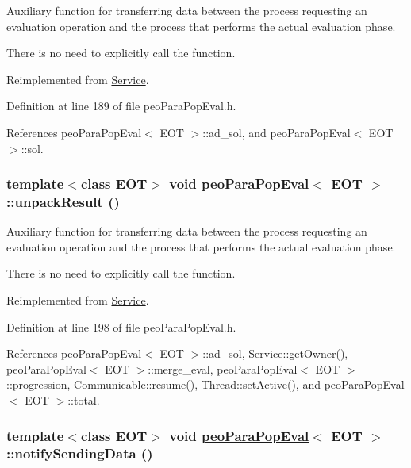 Auxiliary function for transferring data between the process requesting an evaluation operation and the process that performs the actual evaluation phase. 

There is no need to explicitly call the function. 

Reimplemented from \hyperlink{classService_e5e4f90b2315e15c2a2913bd370f4cf5}{Service}.

Definition at line 189 of file peo\-Para\-Pop\-Eval.h.

References peo\-Para\-Pop\-Eval$<$ EOT $>$::ad\_\-sol, and peo\-Para\-Pop\-Eval$<$ EOT $>$::sol.\hypertarget{classpeoParaPopEval_fd7f0afe9cba30be39269d16097e190e}{
\subsubsection[unpackResult]{\setlength{\rightskip}{0pt plus 5cm}template$<$class EOT$>$ void \hyperlink{classpeoParaPopEval}{peo\-Para\-Pop\-Eval}$<$ EOT $>$::unpack\-Result ()}}
\label{classpeoParaPopEval_fd7f0afe9cba30be39269d16097e190e}


Auxiliary function for transferring data between the process requesting an evaluation operation and the process that performs the actual evaluation phase. 

There is no need to explicitly call the function. 

Reimplemented from \hyperlink{classService_45c06344edbfa482b91f68e2035a6099}{Service}.

Definition at line 198 of file peo\-Para\-Pop\-Eval.h.

References peo\-Para\-Pop\-Eval$<$ EOT $>$::ad\_\-sol, Service::get\-Owner(), peo\-Para\-Pop\-Eval$<$ EOT $>$::merge\_\-eval, peo\-Para\-Pop\-Eval$<$ EOT $>$::progression, Communicable::resume(), Thread::set\-Active(), and peo\-Para\-Pop\-Eval$<$ EOT $>$::total.\hypertarget{classpeoParaPopEval_1f78c3cec2940af08a059cc1aa96a9c8}{
\subsubsection[notifySendingData]{\setlength{\rightskip}{0pt plus 5cm}template$<$class EOT$>$ void \hyperlink{classpeoParaPopEval}{peo\-Para\-Pop\-Eval}$<$ EOT $>$::notify\-Sending\-Data ()}}
\label{classpeoParaPopEval_1f78c3cec2940af08a059cc1aa96a9c8}


